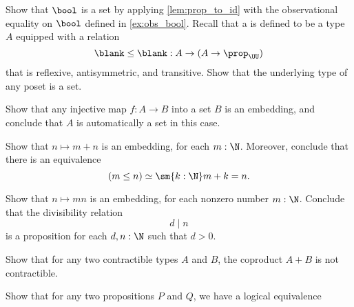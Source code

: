 \begin{exercises}
  \exitem \label{ex:eq_bool}Show that $\bool$ is a set by applying \cref{lem:prop_to_id} with the observational equality on $\bool$ defined in \cref{ex:obs_bool}.
  \exitem Recall that a  is defined to be a type $A$ equipped with a relation
  \begin{equation*}
    \blank\leq\blank : A \to (A \to \prop_\UU)
  \end{equation*}
  that is reflexive, antisymmetric, and transitive. Show that the underlying type of any poset is a set.
  \exitem
  \begin{subexenum}
  \item \label{cor:is-emb-is-injective}
    Show that any injective map $f:A\to B$ into a set $B$ is an embedding, and conclude that $A$ is automatically a set in this case.
  \item Show that $n\mapsto m+n$ is an embedding, for each $m:\N$. Moreover, conclude that there is an equivalence
    \begin{equation*}
      (m\leq n)\simeq \sm{k:\N}m+k=n.
    \end{equation*}
  \item Show that $n\mapsto mn$ is an embedding, for each nonzero number $m:\N$. Conclude that the divisibility relation
    \begin{equation*}
      d\mid n
    \end{equation*}
    is a proposition for each $d,n:\N$ such that $d>0$. 
  \end{subexenum}
  \exitem \label{ex:set_coprod}
  \begin{subexenum}
  \item Show that for any two contractible types $A$ and $B$, the coproduct $A+B$ is not contractible.
  \item Show that for any two propositions $P$ and $Q$, we have a logical equivalence

\end{subexenum}
\end{exercises}
